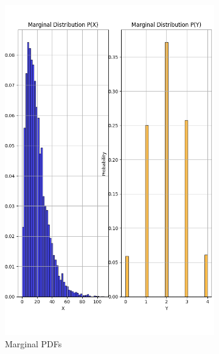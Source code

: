 \documentclass{article}
\begin{document}
\begin{figure}[H]
  \centering
  \begin{subfigure}{0.45\textwidth}
    \centering
    \includegraphics[width=\linewidth]{results/section2/c(1).png}
    \caption{Marginal PDFs}
  \end{subfigure}
  \hfill
  \begin{subfigure}{0.45\textwidth}
    \centering

\end{subfigure}
\end{figure}
\end{document}

